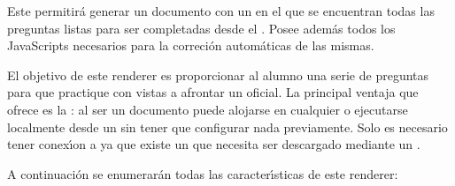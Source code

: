 

Este  permitir\'a generar un documento  con un  en el que se encuentran todas las
preguntas listas para ser completadas desde el . Posee adem\'as todos los JavaScripts necesarios
para la correci\'on autom\'aticas de las mismas.
\bigskip

El objetivo de este renderer es proporcionar al alumno una serie de preguntas para que practique con vistas
a afrontar un  oficial. La principal ventaja que ofrece es la : al ser un documento  puede
alojarse en cualquier  o ejecutarse localmente desde un  sin tener que configurar nada previamente.
Solo es necesario tener conex\'{\i}on a  ya que existe un  que necesita ser descargado mediante 
un .
\bigskip

A continuaci\'on se enumerar\'an todas las caracter\'{\i}sticas de este renderer:

